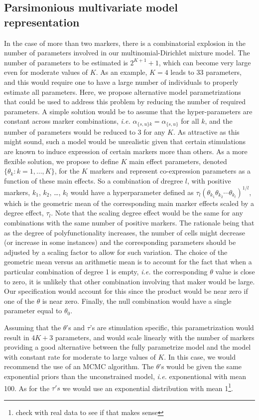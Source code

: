 \documentclass[11pt]{article}
\begin{document}
\subsection{Parsimonious multivariate model representation}
In the case of more than two markers, there is a combinatorial explosion in the number of parameters involved in our multinomial-Dirichlet mixture model. The number of parameters to be estimated is $2^{K+1}+1$, which can become very large even for moderate values of $K$. As an example, $K=4$ leads to 33 parameters, and this would require one to have a large number of individuals to properly estimate all parameters. Here, we propose alternative model parametrizations that could be used to address this problem by reducing the number of required parameters. A simple solution would be to assume that the hyper-parameters are constant across marker combinations, \textit{i.e.} $\alpha_{\{s,u\}k}=\alpha_{\{s,u\}}$ for all $k$, and the number of parameters would be reduced to $3$ for any $K$. As attractive as this might sound, such a model would be unrealistic given that certain stimulations are known to induce expression of certain markers more than others. As a more flexible solution, we propose to define $K$ main effect parameters, denoted $\{\theta_k:k=1,\dots,K\}$, for the $K$ markers and represent co-expression parameters as a function of these main effects. So a combination of dregree $l$, with positive markers, $k_1$, $k_2$, \dots, $k_l$ would have a hyperparameter defined as $\tau_l(\theta_{k_1}\theta_{k_2}\cdots\theta_{k_l})^{1/l}$, which is the geometric mean of the corresponding main marker effects scaled by a degree effect, $\tau_l$. Note that the scaling degree effect would be the same for any combinations with the same number of positive markers. The rationale being that as the degree of polyfunctionality increases, the number of cells might decrease (or increase in some instances) and the corresponding parameters should be adjusted by a scaling factor to allow for such variation. The choice of the geometric mean versus an arithmetic mean is to account for the fact that when a particular combination of degree 1 is empty, \textit{i.e.} the corresponding $\theta$ value is close to zero, it is unlikely that other combination involving that maker would be large. Our specification would account for this since the product would be near zero if one of the $\theta$ is near zero.  Finally, the null combination would have a single parameter equal to $\theta_0$.

Assuming that the $\theta$'s and $\tau$'s are stimulation specific, this parametrization would result in $4K+3$ parameters, and would scale linearly with the number of markers providing a good alternative between the fully parametrize model and the model with constant rate for moderate to large values of $K$. In this case, we would recommend the use of an MCMC algorithm. The $\theta$'s would be given the same exponential priors than the unconstrained model, \textit{i.e.} exponentional with mean 100. As for the $\tau's$ we would use an exponential distribution with mean 1\footnote{check with real data to see if that makes sense}. 
\end{document}
